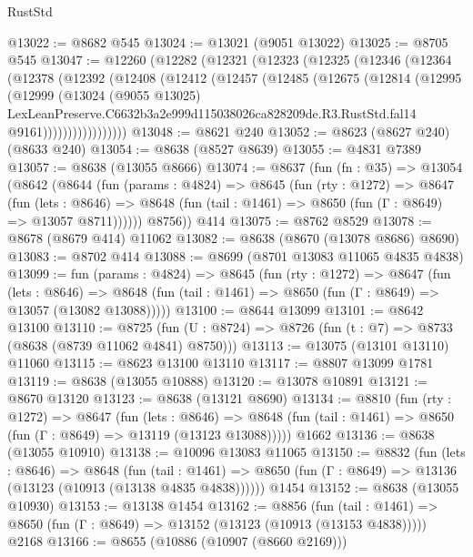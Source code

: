 \begin{lexlean}{RustStd}
\begin{coremodule}
@13022 := @8682 @545
@13024 := @13021 (@9051 @13022)
@13025 := @8705 @545
@13047 := @12260
    (@12282
      (@12321
        (@12323
          (@12325
            (@12346
              (@12364
                (@12378
                  (@12392
                    (@12408
                      (@12412
                        (@12457
                          (@12485
                            (@12675
                              (@12814
                                (@12995
                                  (@12999
                                    (@13024
                                      (@9055 @13025)
                                      LexLeanPreserve.C6632b3a2e999d115038026ca828209de.R3.RustStd.fal14
                                      @9161)))))))))))))))))
@13048 := @8621 @240
@13052 := @8623 (@8627 @240) (@8633 @240)
@13054 := @8638 (@8527 @8639)
@13055 := @4831 @7389
@13057 := @8638 (@13055 @8666)
@13074 := @8637
    (fun (fn : @35) =>
    @13054
      (@8642
        (@8644
          (fun (params : @4824) =>
          @8645
            (fun (rty : @1272) =>
            @8647
              (fun (lets : @8646) =>
              @8648 (fun (tail : @1461) => @8650 (fun (Γ : @8649) => @13057 @8711))))))
        @8756))
    @414
@13075 := @8762 @8529
@13078 := @8678 (@8679 @414) @11062
@13082 := @8638 (@8670 (@13078 @8686) @8690)
@13083 := @8702 @414
@13088 := @8699 (@8701 @13083 @11065 @4835 @4838)
@13099 := fun (params : @4824) =>
  @8645
    (fun (rty : @1272) =>
    @8647
      (fun (lets : @8646) =>
      @8648 (fun (tail : @1461) => @8650 (fun (Γ : @8649) => @13057 (@13082 @13088)))))
@13100 := @8644 @13099
@13101 := @8642 @13100
@13110 := @8725
    (fun (U : @8724) => @8726 (fun (t : @7) => @8733 (@8638 (@8739 @11062 @4841) @8750)))
@13113 := @13075 (@13101 @13110) @11060
@13115 := @8623 @13100 @13110
@13117 := @8807 @13099 @1781
@13119 := @8638 (@13055 @10888)
@13120 := @13078 @10891
@13121 := @8670 @13120
@13123 := @8638 (@13121 @8690)
@13134 := @8810
    (fun (rty : @1272) =>
    @8647
      (fun (lets : @8646) =>
      @8648 (fun (tail : @1461) => @8650 (fun (Γ : @8649) => @13119 (@13123 @13088)))))
    @1662
@13136 := @8638 (@13055 @10910)
@13138 := @10096 @13083 @11065
@13150 := @8832
    (fun (lets : @8646) =>
    @8648
      (fun (tail : @1461) =>
      @8650 (fun (Γ : @8649) => @13136 (@13123 (@10913 (@13138 @4835 @4838))))))
    @1454
@13152 := @8638 (@13055 @10930)
@13153 := @13138 @1454
@13162 := @8856
    (fun (tail : @1461) => @8650 (fun (Γ : @8649) => @13152 (@13123 (@10913 (@13153 @4838)))))
    @2168
@13166 := @8655 (@10886 (@10907 (@8660 @2169)))

\end{coremodule}
\end{lexlean}
